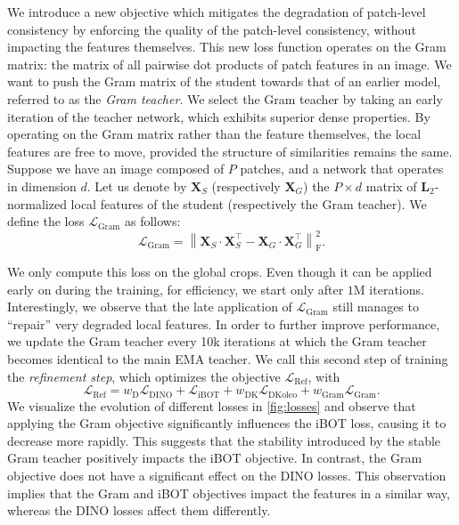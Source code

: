 We introduce a new objective which mitigates the degradation of patch-level consistency by enforcing the quality of the patch-level consistency, without impacting the features themselves.
This new loss function %
operates on the Gram matrix: the matrix of all pairwise dot products of patch features in an image.
We want to push the Gram matrix of the student towards that of an earlier model, referred to as the \emph{Gram teacher}.
We select the Gram teacher by taking an early iteration of the teacher network, which exhibits superior dense properties. 
By operating on the Gram matrix rather than the feature themselves, the local features are free to move, provided the structure of similarities remains the same.
Suppose we have an image composed of $P$ patches, and a network that operates in dimension $d$.
Let us denote by $\mathbf{X}_S$ (respectively $\mathbf{X}_{G}$) the $P \times d$ matrix of $\mathbf{L}_2$-normalized local features of the student (respectively the Gram teacher).
We define the loss $\mathcal{L}_{\text{Gram}}$ as follows: 
\begin{equation}
  \mathcal{L}_{\text{Gram}} = \left \| \mathbf{X}_{S} \cdot \mathbf{X}_{S}^\top - \mathbf{X}_{G} \cdot \mathbf{X}_{G}^\top  \right \|_\text{F}^2.
  \label{eq:gram-loss}
\end{equation}

We only compute this loss on the global crops.
Even though it can be applied early on during the training, for efficiency, we start only after $1$M iterations.
Interestingly, we observe that the late application of $\mathcal{L}_{\text{Gram}}$ still manages to ``repair'' very degraded local features.
In order to further improve performance, we update the Gram teacher every 10k iterations at which the Gram teacher becomes identical to the main EMA teacher.  
We call this second step of training the \emph{refinement step}, which optimizes the objective $\mathcal{L}_\mathrm{Ref}$, with 
\begin{equation}
    \mathcal{L}_\mathrm{Ref} = w_{\mathrm{D}}\mathcal{L_{\mathrm{DINO}}} + \mathcal{L}_{\mathrm{iBOT}} + w_{\mathrm{DK}}\mathcal{L}_{\mathrm{DKoleo}} + w_{\mathrm{Gram}}\mathcal{L}_{\mathrm{Gram}}.
\end{equation}
We visualize the evolution of different losses in \cref{fig:losses} and observe that applying the Gram objective significantly influences the iBOT loss, causing it to decrease more rapidly. 
This suggests that the stability introduced by the stable Gram teacher positively impacts the iBOT objective. In contrast, the Gram objective does not have a significant effect on the DINO losses. 
This observation implies that the Gram and iBOT objectives impact the features in a similar way, whereas the DINO losses affect them differently.

